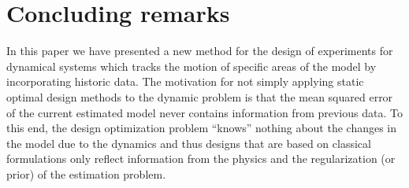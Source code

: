 \documentclass[final,leqno,onefignum,onetabnum]{siamltexmm}
\begin{document}
\section{Concluding remarks}
In this paper we have presented a new method for the design of experiments for dynamical systems which tracks the motion of specific areas of the model by incorporating historic data. 
The motivation for not simply applying static optimal design methods to the dynamic problem is that the mean squared error of the current estimated model never contains information from previous data.
To this end, the design optimization problem ``knows'' nothing about the changes in  the model due to the dynamics and thus designs that are based on classical formulations only reflect information from the physics and the regularization (or prior) of the estimation problem.  
\end{document}
